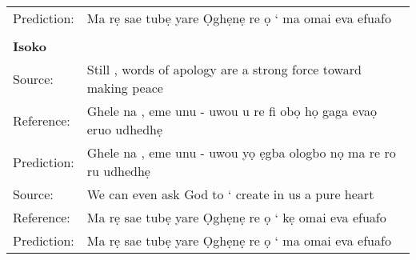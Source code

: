 \documentclass{article} %
\begin{document}
\begin{table}[h]
\begin{center}
\begin{tabular}{ll}
	 Prediction: & Ma rẹ sae tubẹ yare Ọghẹnẹ re ọ ‘ ma omai eva efuafo \\ 
     \\
     \textbf{Isoko}  & \\
    \toprule
    \toprule
	 Source: &    Still , words of apology are a strong force toward making peace \\
	 Reference: & Ghele na , eme unu - uwou u re fi obọ họ gaga evaọ eruo udhedhẹ \\
	 Prediction: & Ghele na , eme unu - uwou yọ ẹgba ologbo nọ ma re ro ru udhedhẹ \\
  \midrule
	 Source:  &   We can even ask God to ‘ create in us a pure heart \\
	 Reference: &  Ma rẹ sae tubẹ yare Ọghẹnẹ re ọ ‘ kẹ omai eva efuafo \\
	 Prediction: & Ma rẹ sae tubẹ yare Ọghẹnẹ re ọ ‘ ma omai eva efuafo \\ 
  \end{tabular}
\end{center}
\end{table}
\end{document}
